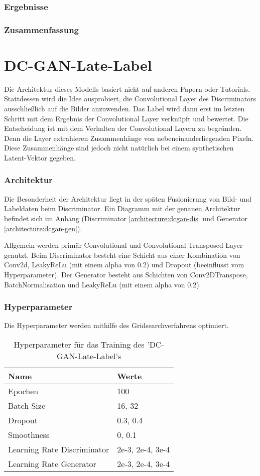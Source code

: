 \subsubsection{Ergebnisse}
\subsubsection{Zusammenfassung}


\section{DC-GAN-Late-Label}
\label{section:dc-gan-late-label}
Die Architektur dieses Modells basiert nicht auf anderen Papern oder Tutorials.
Stattdessen wird die Idee ausprobiert, die Convolutional Layer des Discriminators ausschließlich auf die Bilder anzuwenden.
Das Label wird dann erst im letzten Schritt mit dem Ergebnis der Convolutional Layer verknüpft und bewertet.
Die Entscheidung ist mit dem Verhalten der Convolutional Layern zu begründen.
Denn die Layer extrahieren Zusammenhänge von nebeneinanderliegenden Pixeln.
Diese Zusammenhänge sind jedoch nicht natürlich bei einem synthetischen Latent-Vektor gegeben.

\subsubsection{Architektur}
Die Besonderheit der Architektur liegt in der späten Fusionierung von Bild- und Labeldaten beim Discriminator.
Ein Diagramm mit der genauen Architektur befindet sich im Anhang (Discriminator \cref{architecture:dcgan-dis} und Generator \cref{architecture:dcgan-gen}).


Allgemein werden primär Convolutional und Convolutional Transposed Layer genutzt.
Beim Discriminator besteht eine Schicht aus einer Kombination von Conv2d, LeakyReLu (mit einem alpha von 0.2) und Dropout (beeinflusst vom Hyperparameter).
Der Generator besteht aus Schichten von Conv2DTranspose, BatchNormalisation und LeakyReLu (mit einem alpha von 0.2).

\subsubsection{Hyperparameter}
Die Hyperparameter werden mithilfe des Gridsearchverfahrens optimiert.
\begin{table}[H]
	\centering
	\begin{tabular}{l l}
		Name                        & Werte            \\ \hline
		Epochen                     & 100              \\
		Batch Size                  & 16, 32           \\
		Dropout                     & 0.3, 0.4         \\
		Smoothness                  & 0, 0.1           \\
		Learning Rate Discriminator & 2e-3, 2e-4, 3e-4 \\
		Learning Rate Generator     & 2e-3, 2e-4, 3e-4
	\end{tabular}
	\caption{Hyperparameter für das Training des 'DC-GAN-Late-Label's}
\end{table}

